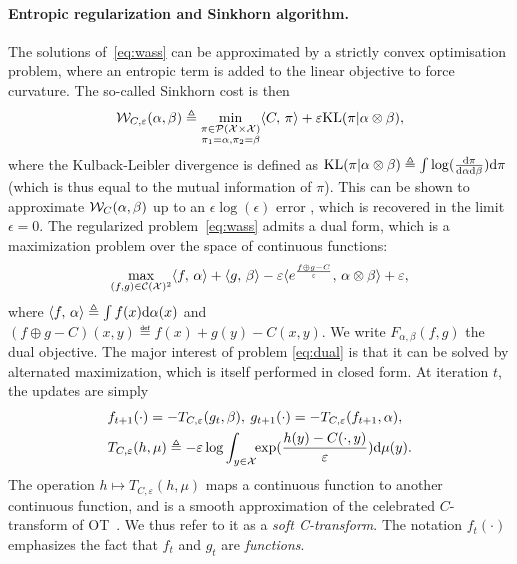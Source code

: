 \paragraph{Entropic regularization and Sinkhorn algorithm.} 

The solutions of~\eqref{eq:wass} can be approximated by a strictly convex optimisation problem, where an entropic term is added to the linear objective to force curvature. The so-called Sinkhorn cost is then
\begin{equation}\label{eq:wass}
    \mathcal{W}_{C,\varepsilon}(\alpha, \beta) \triangleq 
    \min_{
    \substack{
        \pi \in \mathcal{P}(\mathcal{X} \times \mathcal{X})
        \\\pi_1 = \alpha, \pi_2 = \beta
    }    
    } \langle C,\,\pi\rangle + \varepsilon \textrm{KL}(\pi | \alpha \otimes \beta),
\end{equation}
where the Kulback-Leibler divergence is defined as $\textrm{KL}(\pi | \alpha \otimes
\beta) \triangleq \int \log(\frac{\textrm{d}\pi}{\textrm{d}\alpha\textrm{d}\beta}) \textrm{d}\pi$ (which is thus equal to
the mutual information of $\pi$).
%
This can be shown to approximate $\mathcal{W}_C(\alpha,\beta)$  up to an $\epsilon
\log(\epsilon)$ error \citep{2019-Genevay-aistats}, which is recovered in the
limit $\epsilon=0$. 
%
The regularized problem~\eqref{eq:wass} admits a dual form, which is a maximization problem over the space of continuous functions:
\begin{equation}\label{eq:dual}
    \max_{(f, g) \in \mathcal{C}(\mathcal{X})^2} \langle f,\,\alpha\rangle + \langle g,\,\beta\rangle
    - \varepsilon \langle e^{\frac{f \oplus g - C}{\varepsilon}},\,\alpha \otimes \beta\rangle + \varepsilon, 
\end{equation}
where $\langle f,\,\alpha\rangle \triangleq \int f(x) \textrm{d}\alpha(x)$ and $(f \oplus g - C)(x,y)
\eqdef f(x)+g(y)-C(x,y)$. We write $F_{\alpha, \beta}(f, g)$ the dual objective. 
The major interest of problem \eqref{eq:dual} is that it can be solved by alternated maximization, which is itself performed in closed form. At iteration $t$, the updates are simply
\begin{align}
    &f_{t+1}(\cdot) = - T_{C,\varepsilon}(g_t, \beta), \:
    g_{t+1}(\cdot) = - T_{C,\varepsilon}(f_{t+1}, \alpha), \\
    &
    T_{C,\varepsilon}(h, \mu) \triangleq 
    - \varepsilon \log \int_{y \in \mathcal{X}}\!\! \exp(\frac{h(y) - C(\cdot, y)}{\varepsilon})\textrm{d} \mu(y).\label{eq:sinkhorn}
\end{align}
The operation $h \mapsto T_{C,\varepsilon}(h, \mu)$  maps a continuous function to another continuous function, and is a smooth approximation of the celebrated $C$-transform of OT~\cite{santambrogio2015optimal}. We thus refer to it as a \textit{soft C-transform}. 
%
The notation $f_t(\cdot)$ emphasizes the fact that $f_t$ and $g_t$ are \textit{functions}. 
%

